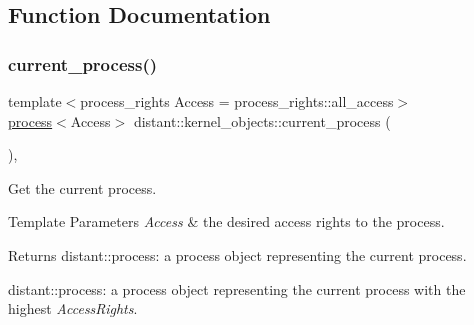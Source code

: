 \subsection{Function Documentation}
\mbox{\label{namespacedistant_1_1kernel__objects_a45b5fb9ff08d50ed36f83bcedf01272b}} 
\subsubsection{\texorpdfstring{current\+\_\+process()}{current\_process()}\hspace{0.1cm}{\footnotesize\ttfamily [1/2]}}
{\footnotesize\ttfamily template$<$process\+\_\+rights Access = process\+\_\+rights\+::all\+\_\+access$>$ \\
\mbox{\hyperlink{classdistant_1_1kernel__objects_1_1process}{process}}$<$Access$>$ distant\+::kernel\+\_\+objects\+::current\+\_\+process (\begin{DoxyParamCaption}{ }\end{DoxyParamCaption})\hspace{0.3cm}{\ttfamily [inline]}, {\ttfamily [noexcept]}}



Get the current process. 


\begin{DoxyTemplParams}{Template Parameters}
{\em Access} & the desired access rights to the process. \\
\hline
\end{DoxyTemplParams}
\begin{DoxyReturn}{Returns}
distant\+::process\+: a process object representing the current process.

distant\+::process\+: a process object representing the current process with the highest {\itshape Access\+Rights}. 
\end{DoxyReturn}
\mbox{\label{namespacedistant_1_1kernel__objects_aa666b1f055c5bb805240da3191333474}} 

